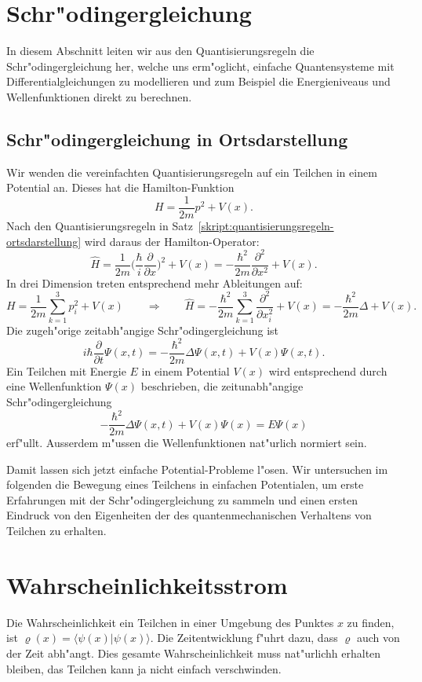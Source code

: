 \section{Schr"odingergleichung}
In diesem Abschnitt leiten wir aus den Quantisierungsregeln die
Schr"odingergleichung her, welche uns erm"oglicht, einfache
Quantensysteme mit Differentialgleichungen zu modellieren
und zum Beispiel die Energieniveaus und Wellenfunktionen direkt
zu berechnen.

\subsection{Schr"odingergleichung in Ortsdarstellung}
Wir wenden die vereinfachten Quantisierungsregeln auf ein
Teilchen in einem Potential an.
Dieses hat die Hamilton-Funktion
\[
H=\frac1{2m}p^2+V(x).
\]
Nach den Quantisierungsregeln in
Satz~\ref{skript:quantisierungsregeln-ortsdarstellung} wird daraus
der Hamilton-Operator:
\[
\hat H
=
\frac{1}{2m}\biggl(\frac{\hbar}{i}\frac{\partial }{\partial x}\biggr)^2
+V(x)
=
-\frac{\hbar^2}{2m}\frac{\partial^2}{\partial x^2}+V(x).
\]
In drei Dimension treten entsprechend mehr Ableitungen auf:
\[
H=\frac1{2m}\sum_{k=1}^3p_i^2+V(x)
\qquad\Rightarrow\qquad
\hat H
=
-\frac{\hbar^2}{2m}\sum_{k=1}^3\frac{\partial^2}{\partial x_i^2}+V(x)
=
-\frac{\hbar^2}{2m}\Delta + V(x).
\]
Die zugeh"orige zeitabh"angige Schr"odingergleichung ist
\[
i\hbar\frac{\partial}{\partial t}\Psi(x,t)
=
-\frac{\hbar^2}{2m}\Delta\Psi(x,t) + V(x)\Psi(x,t).
\]
Ein Teilchen mit Energie $E$ in einem Potential $V(x)$ wird entsprechend
durch eine Wellenfunktion $\Psi(x)$ beschrieben, die zeitunabh"angige
Schr"odingergleichung
\[
-\frac{\hbar^2}{2m}\Delta\Psi(x,t) + V(x)\Psi(x)
=
E\Psi(x)
\]
erf"ullt.
Ausserdem m"ussen die Wellenfunktionen nat"urlich normiert sein.

Damit lassen sich jetzt einfache Potential-Probleme l"osen.
Wir untersuchen im folgenden die Bewegung eines Teilchens in einfachen
Potentialen, um erste Erfahrungen mit der Schr"odingergleichung
zu sammeln und einen ersten Eindruck von den Eigenheiten der
des quantenmechanischen Verhaltens von Teilchen zu erhalten.




\section{Wahrscheinlichkeitsstrom}
Die Wahrscheinlichkeit ein Teilchen in einer Umgebung des
Punktes $x$ zu finden, ist $\varrho(x)=\langle \psi(x)|\psi(x)\rangle$.
Die Zeitentwicklung f"uhrt dazu, dass $\varrho$ auch von der
Zeit abh"angt.
Dies gesamte Wahrscheinlichkeit muss nat"urlichh erhalten bleiben,
das Teilchen kann ja nicht einfach verschwinden.

